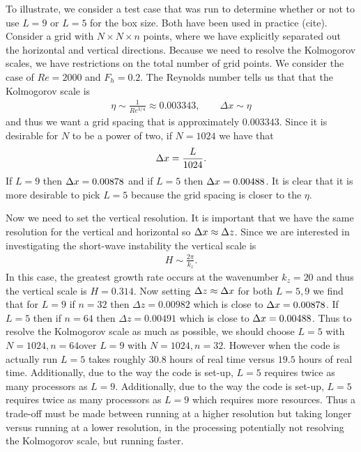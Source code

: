 To illustrate, we consider a test case that was run to determine whether or not to use $L=9$ or $L=5$ for the box size. Both have been used in practice (cite). Consider a grid with $N\times N \times n$ points, where we have explicitly separated out the horizontal and vertical directions. Because we need to resolve the Kolmogorov scales, we have restrictions on the total number of grid points. We consider the case of $Re=2000$ and $F_{h}=0.2$. The Reynolds number tells us that that the Kolmogorov scale is
\begin{align}
\eta \sim \frac{1}{Re^{3/4}} \approx 0.003343,\qquad \Delta x \sim \eta 
\end{align}
and thus we want a grid spacing that is approximately $0.003343$. Since it is desirable for $N$ to be a power of two, if $N=1024$ we have that 
\begin{align}
\Delta x = \frac{L}{1024}.
\end{align}
If $L=9$ then $\Delta x=0.00878$ and if $L=5$ then $\Delta x=0.00488$. It is clear that it is more desirable to pick $L=5$ because the grid spacing is closer to the $\eta$. 

Now we need to set the vertical resolution. It is important that we have the same resolution for the vertical and horizontal so $\Delta x \approx \Delta z$. Since we are interested in investigating the short-wave instability the vertical scale is 
\begin{align}
H \sim \frac{2\pi}{k_{z}}.
\end{align}
In this case, the greatest growth rate occurs at the wavenumber $k_{z}=20$ and thus the vertical scale is $H=0.314$. Now setting $\Delta z \approx \Delta x$ for both $L=5,9$ we find that for $L=9$ if $n=32$ then $\Delta z=0.00982$ which is close to $\Delta x=0.00878$. If $L=5$ then if $n=64$ then $\Delta z=0.00491$ which is close to $\Delta x=0.00488$. Thus to resolve the Kolmogorov scale as much as possible, we should choose $L=5$ with $N=1024, n=64$over $L=9$ with $N=1024, n=32$. However when the code is actually run $L=5$ takes roughly $30.8$ hours of real time versus $19.5$ hours of real time. Additionally, due to the way the code is set-up, $L=5$ requires twice as many processors as $L=9$. Additionally, due to the way the code is set-up, $L=5$ requires twice as many processors as $L=9$ which requires more resources. Thus a trade-off must be made between running at a higher resolution but taking longer versus running at a lower resolution, in the processing potentially not resolving the Kolmogorov scale, but running faster. 

